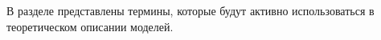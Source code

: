 В разделе представлены термины, которые будут активно использоваться в теоретическом описании моделей.
